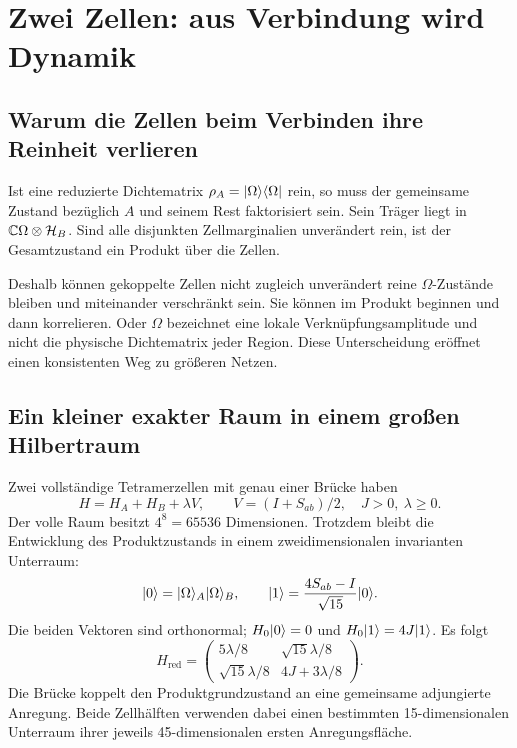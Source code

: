 \chapter{Zwei Zellen: aus Verbindung wird Dynamik}
\label{ch:two}
\section{Warum die Zellen beim Verbinden ihre Reinheit verlieren}
Ist eine reduzierte Dichtematrix $\rho_A=\lvert\Omega\rangle\langle\Omega\rvert$ rein, so muss der gemeinsame Zustand bezüglich $A$ und seinem Rest faktorisiert sein. Sein Träger liegt in $\mathbb C\Omega\otimes\mathcal H_B$. Sind alle disjunkten Zellmarginalien unverändert rein, ist der Gesamtzustand ein Produkt über die Zellen.

Deshalb können gekoppelte Zellen nicht zugleich unverändert reine $\Omega$-Zustände bleiben und miteinander verschränkt sein. Sie können im Produkt beginnen und dann korrelieren. Oder $\Omega$ bezeichnet eine lokale Verknüpfungsamplitude und nicht die physische Dichtematrix jeder Region. Diese Unterscheidung eröffnet einen konsistenten Weg zu größeren Netzen. 

\section{Ein kleiner exakter Raum in einem großen Hilbertraum}
Zwei vollständige Tetramerzellen mit genau einer Brücke haben
\begin{equation}
H=H_A+H_B+\lambda V,\qquad V=(I+S_{ab})/2,\quad J>0,\ \lambda\ge0.
\end{equation}
Der volle Raum besitzt $4^8=65536$ Dimensionen. Trotzdem bleibt die Entwicklung des Produktzustands in einem zweidimensionalen invarianten Unterraum:
\begin{equation}
\lvert0\rangle=\lvert\Omega\rangle_A\lvert\Omega\rangle_B,\qquad
\lvert1\rangle=\frac{4S_{ab}-I}{\sqrt{15}}\lvert0\rangle.
\end{equation}
Die beiden Vektoren sind orthonormal; $H_0\lvert0\rangle=0$ und $H_0\lvert1\rangle=4J\lvert1\rangle$. Es folgt
\begin{equation}
\boxed{H_{\mathrm{red}}=
\begin{pmatrix}
5\lambda/8&\sqrt{15}\lambda/8\\
\sqrt{15}\lambda/8&4J+3\lambda/8
\end{pmatrix}.}
\label{eq:Hred}
\end{equation}
Die Brücke koppelt den Produktgrundzustand an eine gemeinsame adjungierte Anregung. Beide Zellhälften verwenden dabei einen bestimmten 15-dimensionalen Unterraum ihrer jeweils 45-dimensionalen ersten Anregungsfläche. 

